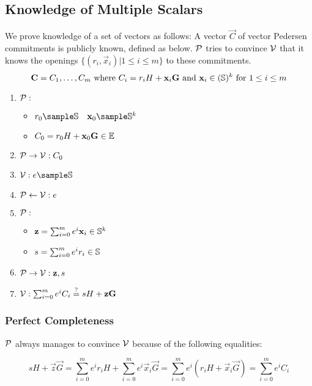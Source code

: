 \subsection{Knowledge of Multiple Scalars}

We prove knowledge of a set of vectors as follows:
A vector $\vec{C}$ of vector Pedersen commitments is publicly known, defined as below.
$\mathcal{P}$ tries to convince $\mathcal{V}$ that it knows the openings $\{ (r_i, \vec{x}_i) \vert 1 \leq i \leq m \}$ to these commitments.
%
\[
    \vec{C} = C_1, \ldots, C_m\ \text{where}\ C_i = r_iH + \vec{x}_i\vec{G}\ \text{and}\ \vec{x}_i \in (\scalars)^k\ \text{for}\ 1 \leq i \leq m
\]

\begin{enumerate}
    \item $\mathcal{P}:$
        \begin{itemize}
            \item $r_0 \sample \scalars \quad \vec{x}_0 \sample \scalars^k$
            \item $C_0 = r_0 H + \mathbf{x}_0\mathbf{G} \in \mathbb{E}$
        \end{itemize}
    \item $\mathcal{P} \to \mathcal{V}: C_0$
    \item \hfill $\verifier: e \sample \scalars$
    \item \hfill $\mathcal{P} \leftarrow \mathcal{V}: e$
    \item $\mathcal{P}:$
        \begin{itemize}
            \item $\mathbf{z} = \sum^m_{i = 0} e^i \mathbf{x}_i \in \mathbb{S}^k$
            \item $s = \sum^m_{i = 0} e^i r_i \in \mathbb{S}$
        \end{itemize}
    \item $\mathcal{P} \to \mathcal{V}: \mathbf{z}, s$
    \item \hfill $\mathcal{V}: \sum^m_{i = 0} e^i C_i \overset{?}{=} sH + \mathbf{z}\mathbf{G}$
\end{enumerate}

\subsubsection{Perfect Completeness}

$\mathcal{P}$ always manages to convince $\mathcal{V}$ because of the following equalities:

\[
    sH + \vec{z}\vec{G}
    = \sum^m_{i = 0} e^i r_i H + \sum^m_{i = 0} e^i \vec{x}_i \vec{G}
    = \sum^m_{i = 0} e^i (r_i H + \vec{x}_i \vec{G}) = \sum^m_{i = 0} e^i C_i
\]

